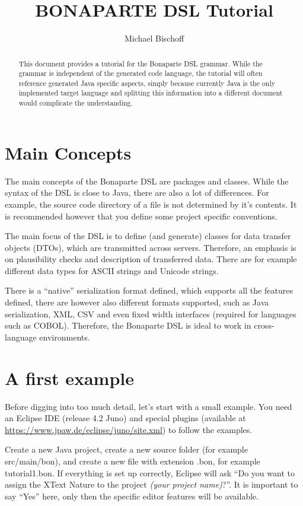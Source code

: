 \documentclass[11pt,a4paper,oneside]{article}
\title{BONAPARTE DSL Tutorial}
\author{Michael Bischoff}
\begin{document}
\maketitle
\begin{abstract}
This document provides a tutorial for the Bonaparte DSL grammar. While the grammar is independent of the generated code language,
the tutorial will often reference generated Java specific aspects, simply because currently Java is the only implemented target language
and splitting this information into a different document would complicate the understanding.
\end{abstract}

\section{Main Concepts}
The main concepts of the Bonaparte DSL are packages and classes. While the syntax of the DSL is close to Java, there are also a lot of differences.
For example, the source code directory of a file is not determined by it's contents. It is recommended however that you define some project specific
conventions.

The main focus of the DSL is to define (and generate) classes for data transfer objects (DTOs), which are transmitted across servers.
Therefore, an emphasis is on plausibility checks and description of transferred data. There are for example different data types for ASCII strings
and Unicode strings.

There is a ``native'' serialization format defined, which supports all the features defined, there are however also different formats supported,
such as Java serialization, XML, CSV and even fixed width interfaces (required for languages such as COBOL). Therefore, the Bonaparte DSL
is ideal to work in cross-language environments.


\section{A first example}
Before digging into too much detail, let's start with a small example.  You need an Eclipse IDE (release 4.2 Juno) and special plugins
(available at \url{https://www.jpaw.de/eclipse/juno/site.xml}) to follow the examples.

Create a new Java project, create a new source folder (for example {\ttfamily src/main/bon}), and create a new file with extension {\ttfamily .bon},
for example {\ttfamily tutorial1.bon}. If everything is set up correctly, Eclipse will ask ``Do you want to assign the XText Nature to the project
 {\it{ (your project name)}}?''.
It is important to say ``Yes'' here, only then the specific editor features will be available.
\end{document}
